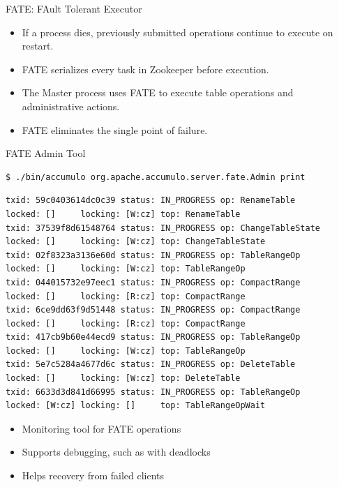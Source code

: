 \documentclass[t,landscape]{beamer}
\begin{document}
\begin{frame}{FATE: FAult Tolerant Executor}
\begin{itemize}
\item{If a process dies, previously submitted operations continue to execute on restart.}
\item{FATE serializes every task in Zookeeper before execution.}
\item{The Master process uses FATE to execute table operations and administrative actions.}
\item{FATE eliminates the single point of failure.}
\end{itemize}
\end{frame}

\begin{frame}[fragile]{FATE Admin Tool}
\newsavebox{\fateadmincommandbox}
\newsavebox{\fateadminbox}
\begin{lrbox}{\fateadmincommandbox}
\begin{minipage}{9in}
\color{white}
\begin{verbatim}
$ ./bin/accumulo org.apache.accumulo.server.fate.Admin print
\end{verbatim}
\end{minipage}
\end{lrbox}
\begin{lrbox}{\fateadminbox}
\begin{minipage}{9in}
\begin{verbatim}
txid: 59c0403614dc0c39 status: IN_PROGRESS op: RenameTable      locked: []     locking: [W:cz] top: RenameTable
txid: 37539f8d61548764 status: IN_PROGRESS op: ChangeTableState locked: []     locking: [W:cz] top: ChangeTableState
txid: 02f8323a3136e60d status: IN_PROGRESS op: TableRangeOp     locked: []     locking: [W:cz] top: TableRangeOp
txid: 044015732e97eec1 status: IN_PROGRESS op: CompactRange     locked: []     locking: [R:cz] top: CompactRange
txid: 6ce9dd63f9d51448 status: IN_PROGRESS op: CompactRange     locked: []     locking: [R:cz] top: CompactRange
txid: 417cb9b60e44ecd9 status: IN_PROGRESS op: TableRangeOp     locked: []     locking: [W:cz] top: TableRangeOp
txid: 5e7c5284a4677d6c status: IN_PROGRESS op: DeleteTable      locked: []     locking: [W:cz] top: DeleteTable
txid: 6633d3d841d66995 status: IN_PROGRESS op: TableRangeOp     locked: [W:cz] locking: []     top: TableRangeOpWait
\end{verbatim}
\end{minipage}
\end{lrbox}
\begin{block}{\resizebox{0.9\textwidth}{!}{\usebox{\fateadmincommandbox}}}
\resizebox{0.9\textwidth}{!}{\usebox{\fateadminbox}}
\end{block}
\scriptsize
\begin{itemize}
\item{Monitoring tool for FATE operations}
\item{Supports debugging, such as with deadlocks}
\item{Helps recovery from failed clients}
\end{itemize}
\end{frame}
\end{document}
